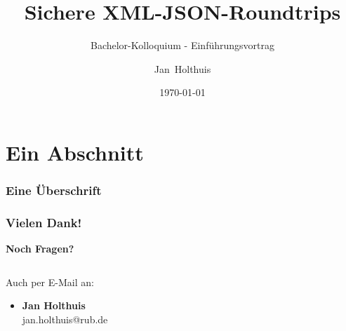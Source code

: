 \documentclass[alternativetitlepage=bild,cornerlogo=hgi_nds_logo2]{rubpresentation}
\title[XML/JSON-Konversion]
{Sichere XML-JSON-Roundtrips}
\subtitle{Bachelor-Kolloquium -  Einführungsvortrag}
\author[Holthuis]{Jan~Holthuis}
\institute[Ruhr-Uni Bochum]
{%
Lehrstuhl für Netz- und Datensicherheit\\
Ruhr-Universität Bochum
}
\date%
{\today}
\begin{document}
\frame[plain]{\titlepage}



\section[Section]{Ein Abschnitt}

\begin{frame}[plain]
    \frametitle{Eine Überschrift}
\blindtext{}
\end{frame}


\begin{frame}[plain]
\frametitle{Vielen Dank!}
 \begin{center}
 {\bfseries\fontsize{30pt}{1.2em}\selectfont Noch Fragen?}
 \end{center}
  \begin{columns}
    \begin{column}{0.5\textwidth}
      \begin{center}
        Auch per E-Mail an:
        \begin{itemize}
        \item \textbf{Jan Holthuis}\\
              jan.holthuis@rub.de
        \end{itemize}
      \end{center}
    \end{column}
    \begin{column}{0.5\textwidth}
      \begin{center}
      \end{center}
    \end{column}
  \end{columns}
\end{frame}
\end{document}

